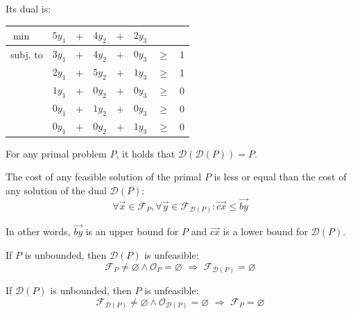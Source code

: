 \begin{description}
\begin{example}
            Its dual is:
            \begin{center}
                \begin{tabular}{lccccccc}
                    \toprule
                    $\min$ & $5y_1$ & $+$ & $4y_2$ & $+$ & $2y_3$ \\
                    \midrule
                    subj. to & $3y_1$ & $+$ & $4y_2$ & $+$ & \color{lightgray}$0y_3$ & $\geq$ & 1 \\
                             & $2y_1$ & $+$ & $5y_2$ & $+$ & $1y_3$ & $\geq$ & 1 \\
                             & $1y_1$ & $+$ & \color{lightgray}$0y_2$ & $+$ & \color{lightgray}$0y_3$ & $\geq$ & 0 \\
                             & \color{lightgray}$0y_1$ & $+$ & $1y_2$ & $+$ & \color{lightgray}$0y_3$ & $\geq$ & 0 \\
                             & \color{lightgray}$0y_1$ & $+$ & \color{lightgray}$0y_2$ & $+$ & $1y_3$ & $\geq$ & 0 \\
                    \bottomrule
                \end{tabular}
            \end{center}
        \end{example}
\end{description}

\begin{theorem}
    For any primal problem $P$, it holds that $\mathcal{D}(\mathcal{D}(P)) = P$.
\end{theorem}

\begin{theorem} 
    The cost of any feasible solution of the primal $P$ is less or equal than the cost of any solution of the dual $\mathcal{D}(P)$:
    \[ \forall \vec{x} \in \mathcal{F}_{P}, \forall \vec{y} \in \mathcal{F}_{\mathcal{D}(P)}: \vec{cx} \leq \vec{by} \]

    In other words, $\vec{by}$ is an upper bound for $P$ and $\vec{cx}$ is a lower bound for $\mathcal{D}(P)$.

    \begin{corollary}
        If $P$ is unbounded, then $\mathcal{D}(P)$ is unfeasible:
        \[ \mathcal{F}_{P} \neq \varnothing \land \mathcal{O}_{P} = \varnothing \,\,\Rightarrow\,\, \mathcal{F}_{\mathcal{D}(P)} = \varnothing \]
    \end{corollary}

    \begin{corollary}
        If $\mathcal{D}(P)$ is unbounded, then $P$ is unfeasible:
        \[ \mathcal{F}_{\mathcal{D}(P)} \neq \varnothing \land \mathcal{O}_{\mathcal{D}(P)} = \varnothing \,\,\Rightarrow\,\, \mathcal{F}_{P} = \varnothing \]
    \end{corollary}
\end{theorem}

